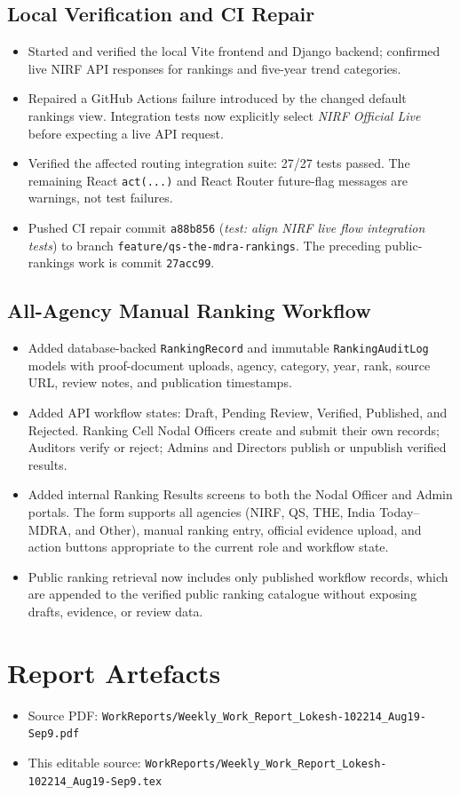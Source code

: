 \documentclass[11pt,a4paper]{article}
\begin{document}
\subsection*{Local Verification and CI Repair}
\begin{itemize}[leftmargin=1.4em,itemsep=2pt]
  \item Started and verified the local Vite frontend and Django backend; confirmed live NIRF API responses for rankings and five-year trend categories.
  \item Repaired a GitHub Actions failure introduced by the changed default rankings view. Integration tests now explicitly select \textit{NIRF Official Live} before expecting a live API request.
  \item Verified the affected routing integration suite: 27/27 tests passed. The remaining React \texttt{act(...)} and React Router future-flag messages are warnings, not test failures.
  \item Pushed CI repair commit \texttt{a88b856} (\textit{test: align NIRF live flow integration tests}) to branch \texttt{feature/qs-the-mdra-rankings}. The preceding public-rankings work is commit \texttt{27acc99}.
\end{itemize}

\subsection*{All-Agency Manual Ranking Workflow}
\begin{itemize}[leftmargin=1.4em,itemsep=2pt]
  \item Added database-backed \texttt{RankingRecord} and immutable \texttt{RankingAuditLog} models with proof-document uploads, agency, category, year, rank, source URL, review notes, and publication timestamps.
  \item Added API workflow states: Draft, Pending Review, Verified, Published, and Rejected. Ranking Cell Nodal Officers create and submit their own records; Auditors verify or reject; Admins and Directors publish or unpublish verified results.
  \item Added internal Ranking Results screens to both the Nodal Officer and Admin portals. The form supports all agencies (NIRF, QS, THE, India Today--MDRA, and Other), manual ranking entry, official evidence upload, and action buttons appropriate to the current role and workflow state.
  \item Public ranking retrieval now includes only published workflow records, which are appended to the verified public ranking catalogue without exposing drafts, evidence, or review data.
\end{itemize}

\section*{Report Artefacts}
\begin{itemize}[leftmargin=1.4em,itemsep=2pt]
  \item Source PDF: \texttt{WorkReports/Weekly\_Work\_Report\_Lokesh-102214\_Aug19-Sep9.pdf}
  \item This editable source: \texttt{WorkReports/Weekly\_Work\_Report\_Lokesh-102214\_Aug19-Sep9.tex}
\end{itemize}
\end{document}
